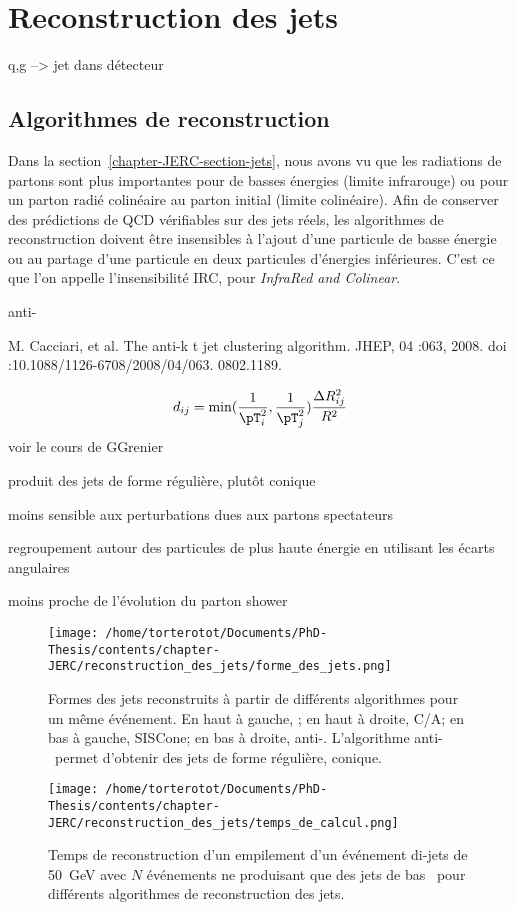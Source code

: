 \section{Reconstruction des jets}\label{chapter-JERC-section-jets_reco}

q,g --> jet dans détecteur


\subsection{Algorithmes de reconstruction}\label{chapter-JERC-section-jets_reco-subsec-algo}
Dans la section~\ref{chapter-JERC-section-jets}, nous avons vu que les radiations de partons sont plus importantes pour de basses énergies (limite infrarouge) ou pour un parton radié colinéaire au parton initial (limite colinéaire).
Afin de conserver des prédictions de QCD vérifiables sur des jets réels, les algorithmes de reconstruction doivent être insensibles à l'ajout d'une particule de basse énergie ou au partage d'une particule en deux particules d'énergies inférieures. C'est ce que l'on appelle l'insensibilité IRC, pour \emph{InfraRed and Colinear}.


anti-\kT

M. Cacciari, et al. The anti-k t jet clustering algorithm. JHEP, 04 :063, 2008.
doi :10.1088/1126-6708/2008/04/063. 0802.1189.

\begin{equation}
d_{ij} = \min(\frac{1}{\pT^2_i}, \frac{1}{\pT^2_j}) \frac{\Delta R^2_{ij}}{R^2}
\end{equation}
voir le cours de GGrenier

produit des jets de forme régulière, plutôt conique

moins sensible aux perturbations dues aux partons spectateurs

regroupement autour des particules de plus haute énergie en utilisant les écarts angulaires

moins proche de l'évolution du parton shower

\begin{figure}
\centering
\texttt{[image: /home/torterotot/Documents/PhD-Thesis/contents/chapter-JERC/reconstruction\_des\_jets/forme\_des\_jets.png]}
\caption{Formes des jets reconstruits à partir de différents algorithmes pour un même événement. En haut à gauche, \kT; en haut à droite, C/A; en bas à gauche, SISCone; en bas à droite, anti-\kT. L'algorithme anti-\kT\ permet d'obtenir des jets de forme régulière, conique.}
\end{figure}
\begin{figure}
\centering
\texttt{[image: /home/torterotot/Documents/PhD-Thesis/contents/chapter-JERC/reconstruction\_des\_jets/temps\_de\_calcul.png]}
\caption{Temps de reconstruction d'un empilement d'un événement di-jets de \SI{50}{\GeV} avec $N$ événements ne produisant que des jets de bas \pT\ pour différents algorithmes de reconstruction des jets.}
\end{figure}

